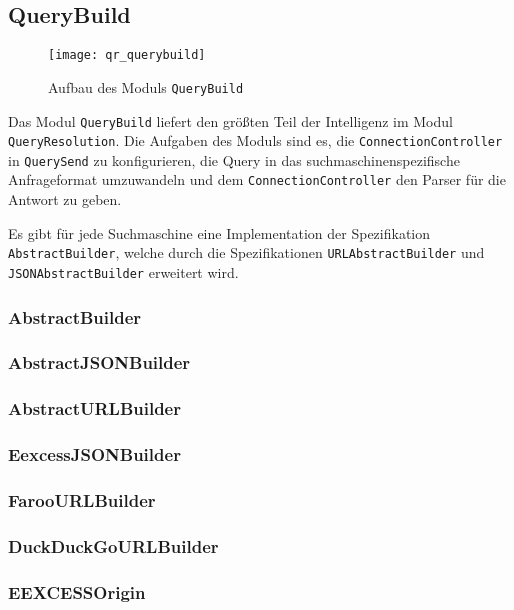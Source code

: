 
\subsection{QueryBuild}

\begin{figure}[htb]
  \texttt{[image: qr\_querybuild]}
  \caption{Aufbau des Moduls \lstinline|QueryBuild|}
	\label{fig:Aufbau des Moduls \lstinline|QueryBuild|}
\end{figure}

Das Modul \lstinline|QueryBuild| liefert den größten Teil der Intelligenz im Modul \lstinline|QueryResolution|. Die Aufgaben des Moduls sind es, die \lstinline|ConnectionController| in \lstinline|QuerySend| zu konfigurieren, die Query in das suchmaschinenspezifische Anfrageformat umzuwandeln und dem \lstinline|ConnectionController| den Parser für die Antwort zu geben.

Es gibt für jede Suchmaschine eine Implementation der Spezifikation \lstinline|AbstractBuilder|, welche durch die Spezifikationen \lstinline|URLAbstractBuilder| und \lstinline|JSONAbstractBuilder| erweitert wird.

\subsubsection{AbstractBuilder}
\subsubsection{AbstractJSONBuilder}
\subsubsection{AbstractURLBuilder}
\subsubsection{EexcessJSONBuilder}
\subsubsection{FarooURLBuilder}
\subsubsection{DuckDuckGoURLBuilder}
\subsubsection{EEXCESSOrigin}

